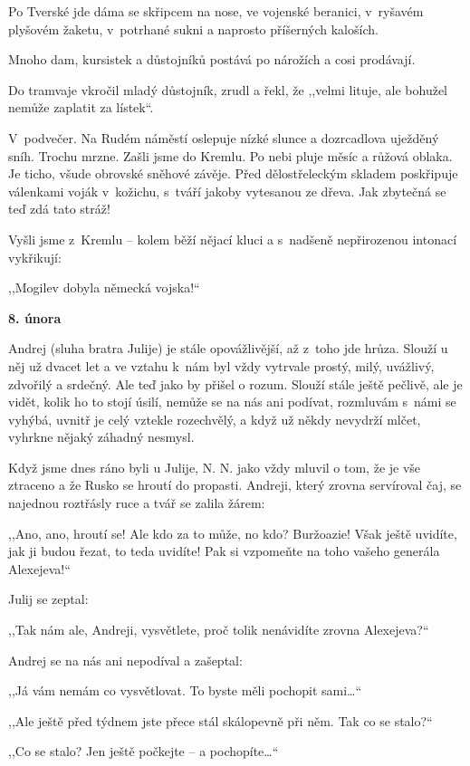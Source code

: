 Po Tverské jde dáma se skřipcem na nose, ve vojenské beranici, v ryšavém plyšovém žaketu, v potrhané sukni a naprosto příšerných kaloších.

Mnoho dam, kursistek a důstojníků postává po nárožích a cosi prodávají.

Do tramvaje vkročil mladý důstojník, zrudl a řekl, že ,,velmi lituje, ale bohužel nemůže zaplatit za lístek``.

V podvečer. Na Rudém náměstí oslepuje nízké slunce a dozrcadlova uježděný sníh. Trochu mrzne. Zašli jsme do Kremlu. Po nebi pluje měsíc a růžová oblaka. Je ticho, všude obrovské sněhové závěje. Před dělostřeleckým skladem poskřipuje válenkami voják v kožichu, s tváří jakoby vytesanou ze dřeva. Jak zbytečná se teď zdá tato stráž!

Vyšli jsme z Kremlu -- kolem běží nějací kluci a s nadšeně nepřirozenou intonací vykřikují:

,,Mogilev dobyla německá vojska!`` 

\medskip

\noindent
\textbf{8. února} 	

\noindent
Andrej (sluha bratra Julije) je stále opovážlivější, až z toho jde hrůza. Slouží u něj už dvacet let a ve vztahu k nám byl vždy vytrvale prostý, milý, uvážlivý, zdvořilý a srdečný. Ale teď jako by přišel o rozum. Slouží stále ještě pečlivě, ale je vidět, kolik ho to stojí úsilí, nemůže se na nás ani podívat, rozmluvám s námi se vyhýbá, uvnitř je celý vztekle rozechvělý, a když už někdy nevydrží mlčet, vyhrkne nějaký záhadný nesmysl.

Když jsme dnes ráno byli u Julije, N. N. jako vždy mluvil o tom, že je vše ztraceno a že Rusko se hroutí do propasti. Andreji, který zrovna servíroval čaj, se najednou roztřásly ruce a tvář se zalila žárem:

,,Ano, ano, hroutí se! Ale kdo za to může, no kdo? Buržoazie! Však ještě uvidíte, jak ji budou řezat, to teda uvidíte! Pak si vzpomeňte na toho vašeho generála Alexejeva!``

Julij se zeptal:

,,Tak nám ale, Andreji, vysvětlete, proč tolik nenávidíte zrovna Alexejeva?``

Andrej se na nás ani nepodíval a zašeptal:

,,Já vám nemám co vysvětlovat. To byste měli pochopit sami\ldots``

,,Ale ještě před týdnem jste přece stál skálopevně při něm. Tak co se stalo?``

,,Co se stalo? Jen ještě počkejte -- a pochopíte\ldots``

